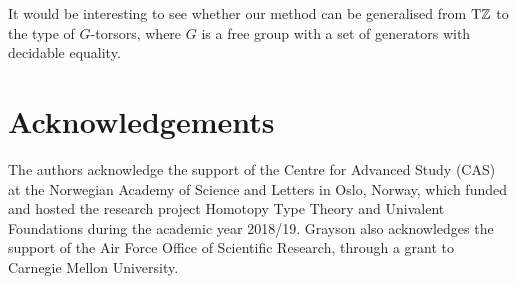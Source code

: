 \documentclass[a4,12pt]{amsart}
\begin{document}
It would be interesting to see whether our method can be generalised
from ${\mathrm{T}\mathbb{Z}}$ to the type of $G$-torsors, where $G$ is a free group with
a set of generators with decidable equality.

\section{Acknowledgements}
The authors acknowledge the support of the Centre for Advanced Study (CAS)
at the Norwegian Academy of Science and Letters
in Oslo, Norway, which funded and hosted the research project Homotopy Type Theory and Univalent Foundations during the academic year 2018/19. 
Grayson also acknowledges the support of the Air Force Office of Scientific Research, through a grant to Carnegie Mellon University.




\end{document}
